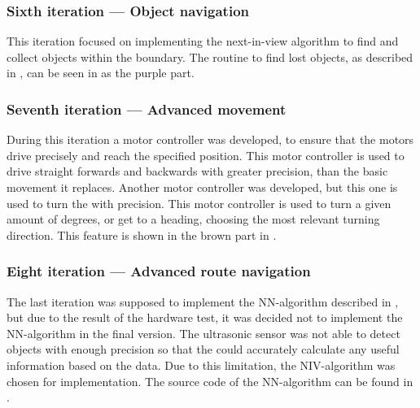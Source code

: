 \subsubsection{Sixth iteration --- Object navigation}
This iteration focused on implementing the next-in-view algorithm to find and collect objects within the boundary. The routine to find lost objects, as described in , can be seen in  as the purple part.


\subsubsection{Seventh iteration --- Advanced movement}
During this iteration a motor controller was developed, to ensure that the motors drive precisely and reach the specified position. This motor controller is used to drive straight forwards and backwards with greater precision, than the basic movement it replaces. Another motor controller was developed, but this one is used to turn the \projname{} with precision. This motor controller is used to turn a given amount of degrees, or get to a heading, choosing the most relevant turning direction. This feature is shown in the brown part in .


\subsubsection{Eight iteration --- Advanced route navigation}
The last iteration was supposed to implement the NN-algorithm described in , but due to the result of the hardware test, it was decided not to implement the NN-algorithm in the final version. The ultrasonic sensor was not able to detect objects with enough precision so that the \projname{} could accurately calculate any useful information based on the data. Due to this limitation, the NIV-algorithm was chosen for implementation. The source code of the NN-algorithm can be found in .



